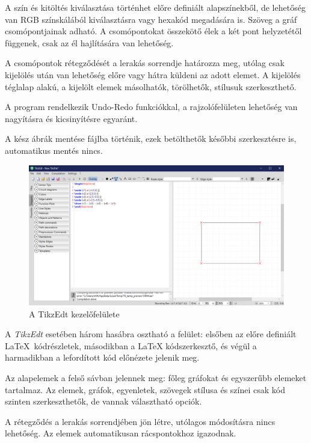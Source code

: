 A szín és kitöltés kiválasztása történhet előre definiált alapszínekből, de lehetőség van RGB színskálából kiválasztásra vagy hexakód megadására is. Szöveg a gráf csomópontjainak adható. A csomópontokat összekötő élek a két pont helyzetétől függenek, csak az él hajlítására van lehetőség. 

A csomópontok rétegződését a lerakás sorrendje határozza meg, utólag csak kijelölés után van lehetőség előre vagy hátra küldeni az adott elemet. A kijelölés téglalap alakú, a kijelölt elemek másolhatók, törölhetők, stílusuk szerkeszthető.  

A program rendelkezik Undo-Redo funkciókkal, a rajzolófelületen lehetőség van nagyításra és kicsinyítésre egyaránt. 

A kész ábrák mentése fájlba történik, ezek betölthetők későbbi szerkesztésre is, automatikus mentés nincs.


\begin{figure}[!h]
	\includegraphics[width=\textwidth]{images/tikzedt.png}
	\caption{A TikzEdt kezelőfelülete \cite{tikzedt}}
\label{fig:tikzedt}
\end{figure}

A \textit{TikzEdt} esetében három hasábra osztható a felület: elsőben az előre definiált \LaTeX\ kódrészletek, másodikban a LaTeX kódszerkesztő, és végül a harmadikban a lefordított kód előnézete jelenik meg. 

Az alapelemek a felső sávban jelennek meg: főleg gráfokat és egyszerűbb elemeket tartalmaz. Az elemek, gráfok, egyenletek, szövegek stílusa és színei csak kód szinten szerkeszthetők, de vannak választható opciók. 

A rétegződés a lerakás sorrendjében jön létre, utólagos módosításra nincs lehetőség. Az elemek automatikusan rácspontokhoz igazodnak. 

